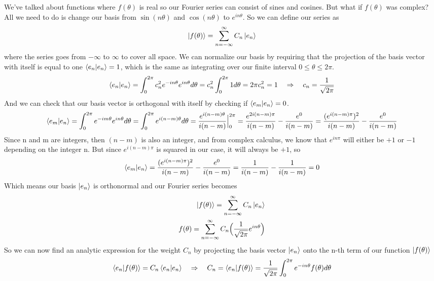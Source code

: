 \documentclass{article}
\newcommand{\be}{\begin{equation}}
\newcommand{\ee}{\end{equation}}
\begin{document}
We've talked about functions where $f(\theta)$ is real so our Fourier series can consist of sines and cosines.
But what if $f(\theta)$ was complex?
All we need to do is change our basis from $\sin(n \theta)$ and $\cos(n \theta)$ to $e^{i n \theta}$.
So we can define our series as
\be
  \ket{f(\theta)} = \sum_{n= - \infty}^{\infty} C_n \ket{e_n}
\ee
where the series goes from $- \infty$ to $\infty$ to cover all space.
We can normalize our basis by requiring that the projection of the basis vector with itself is equal to one $\braket{e_n|e_n} = 1$, which is the same as integrating over our finite interval $0 \leq \theta \leq 2 \pi$.
\be
  \braket{e_n | e_n} = \int_{0}^{2 \pi} c_n^2 e^{-i n \theta} e^{i n \theta} d \theta = c_n^2 \int_{0}^{2 \pi} 1 d \theta = 2 \pi c_n^2 = 1 \quad \Rightarrow \quad c_n = \frac{1}{\sqrt{2 \pi}}
\ee
And we can check that our basis vector is orthogonal with itself by checking if $\braket{e_m|e_n} = 0$.
\be
  \braket{e_m|e_n} = \int_0^{2 \pi} e^{- i m \theta} e^{i n \theta} d \theta = \int_0^{2 \pi} e^{i (n - m) \theta} d\theta = \frac{e^{i (n - m) \theta}}{i (n - m)} \Big|_0^{2 \pi} = \frac{e^{2 i (n - m) \pi}}{i (n - m)} - \frac{e^{0}}{i (n - m)} = \frac{(e^{ i (n - m) \pi})^2}{i (n - m)} - \frac{e^{0}}{i (n - m)}
\ee
Since n and m are integers, then $(n-m)$ is also an integer, and from complex calculus, we know that $e^{i n \pi}$ will either be $+1$ or $-1$ depending on the integer n.
But since $e^{ i (n - m) \pi}$ is squared in our case, it will always be $+1$, so
\be
  \braket{e_m|e_n} = \frac{(e^{ i (n - m) \pi})^2}{i (n - m)} - \frac{e^{0}}{i (n - m)} = \frac{1}{i (n - m)} - \frac{1}{i (n - m)} = 0
\ee
Which means our basis $\ket{e_n}$ is orthonormal and our Fourier series becomes
\be
  \begin{split}
    \ket{f(\theta)} = \sum_{n= - \infty}^{\infty} C_n \ket{e_n} \\
    f(\theta) = \sum_{n= - \infty}^{\infty} C_n \Big( \frac{1}{\sqrt{2 \pi}} e^{i n \theta} \Big)
  \end{split}
\ee
So we can now find an analytic expression for the weight $C_n$ by projecting the basis vector $\ket{e_n}$ onto the n-th term of our function $\ket{f(\theta)}$
\be
  \braket{e_n|f(\theta)} = C_n \braket{e_n|e_n} \quad \Rightarrow \quad C_n = \braket{e_n|f(\theta)} = \frac{1}{\sqrt{2 \pi}} \int_0^{2 \pi} e^{-i n \theta} f(\theta) d \theta
\ee
\end{document}
